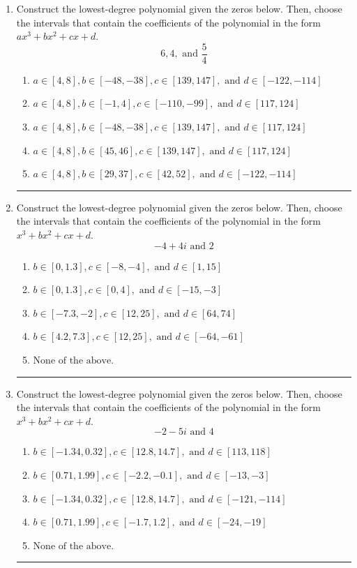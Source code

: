 \documentclass[14pt]{extbook}
\newcommand{\litem}[1]{\item#1\hspace*{-1cm}\rule{\textwidth}{0.4pt}}
\begin{document}
\begin{enumerate}
{\begin{enumerate}[label=\Alph*.]
\end{enumerate} }
\litem{
Construct the lowest-degree polynomial given the zeros below. Then, choose the intervals that contain the coefficients of the polynomial in the form $ax^3+bx^2+cx+d$.\[ 6, 4, \text{ and } \frac{5}{4} \]\begin{enumerate}[label=\Alph*.]
\item \( a \in [4, 8], b \in [-48, -38], c \in [139, 147], \text{ and } d \in [-122, -114] \)
\item \( a \in [4, 8], b \in [-1, 4], c \in [-110, -99], \text{ and } d \in [117, 124] \)
\item \( a \in [4, 8], b \in [-48, -38], c \in [139, 147], \text{ and } d \in [117, 124] \)
\item \( a \in [4, 8], b \in [45, 46], c \in [139, 147], \text{ and } d \in [117, 124] \)
\item \( a \in [4, 8], b \in [29, 37], c \in [42, 52], \text{ and } d \in [-122, -114] \)

\end{enumerate} }
\litem{
Construct the lowest-degree polynomial given the zeros below. Then, choose the intervals that contain the coefficients of the polynomial in the form $x^3+bx^2+cx+d$.\[ -4 + 4 i \text{ and } 2 \]\begin{enumerate}[label=\Alph*.]
\item \( b \in [0, 1.3], c \in [-8, -4], \text{ and } d \in [1, 15] \)
\item \( b \in [0, 1.3], c \in [0, 4], \text{ and } d \in [-15, -3] \)
\item \( b \in [-7.3, -2], c \in [12, 25], \text{ and } d \in [64, 74] \)
\item \( b \in [4.2, 7.3], c \in [12, 25], \text{ and } d \in [-64, -61] \)
\item \( \text{None of the above.} \)

\end{enumerate} }
\litem{
Construct the lowest-degree polynomial given the zeros below. Then, choose the intervals that contain the coefficients of the polynomial in the form $x^3+bx^2+cx+d$.\[ -2 - 5 i \text{ and } 4 \]\begin{enumerate}[label=\Alph*.]
\item \( b \in [-1.34, 0.32], c \in [12.8, 14.7], \text{ and } d \in [113, 118] \)
\item \( b \in [0.71, 1.99], c \in [-2.2, -0.1], \text{ and } d \in [-13, -3] \)
\item \( b \in [-1.34, 0.32], c \in [12.8, 14.7], \text{ and } d \in [-121, -114] \)
\item \( b \in [0.71, 1.99], c \in [-1.7, 1.2], \text{ and } d \in [-24, -19] \)
\item \( \text{None of the above.} \)


\end{enumerate}}
\end{enumerate}
\end{document}
